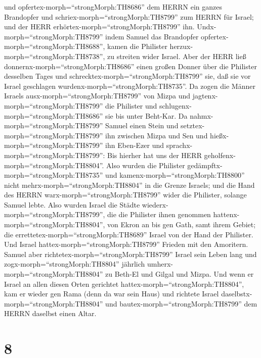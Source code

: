 und opfertex-morph=``strongMorph:TH8686'' dem HERRN ein ganzes
Brandopfer und schriex-morph=``strongMorph:TH8799'' zum HERRN für
Israel; und der HERR erhörtex-morph=``strongMorph:TH8799'' ihn.
 Undx-morph=``strongMorph:TH8799'' indem Samuel das
Brandopfer opfertex-morph=``strongMorph:TH8688'', kamen die Philister
herzux-morph=``strongMorph:TH8738'', zu streiten wider Israel. Aber der
HERR ließ donnernx-morph=``strongMorph:TH8686'' einen großen Donner über
die Philister desselben Tages und
schrecktex-morph=``strongMorph:TH8799'' sie, daß sie vor Israel
geschlagen wurdenx-morph=``strongMorph:TH8735''.  Da zogen
die Männer Israels ausx-morph=``strongMorph:TH8799'' von Mizpa und
jagtenx-morph=``strongMorph:TH8799'' die Philister und
schlugenx-morph=``strongMorph:TH8686'' sie bis unter Beht-Kar.
 Da nahmx-morph=``strongMorph:TH8799'' Samuel einen Stein
und setztex-morph=``strongMorph:TH8799'' ihn zwischen Mizpa und Sen und
hießx-morph=``strongMorph:TH8799'' ihn Eben-Ezer und
sprachx-morph=``strongMorph:TH8799'': Bis hierher hat uns der HERR
geholfenx-morph=``strongMorph:TH8804''.  Also wurden die
Philister gedämpftx-morph=``strongMorph:TH8735'' und
kamenx-morph=``strongMorph:TH8800'' nicht
mehrx-morph=``strongMorph:TH8804'' in die Grenze Israels; und die Hand
des HERRN warx-morph=``strongMorph:TH8799'' wider die Philister, solange
Samuel lebte.  Also wurden Israel die Städte
wiederx-morph=``strongMorph:TH8799'', die die Philister ihnen genommen
hattenx-morph=``strongMorph:TH8804'', von Ekron an bis gen Gath, samt
ihrem Gebiet; die errettetex-morph=``strongMorph:TH8689'' Israel von der
Hand der Philister. Und Israel hattex-morph=``strongMorph:TH8799''
Frieden mit den Amoritern.  Samuel aber
richtetex-morph=``strongMorph:TH8799'' Israel sein Leben lang
 und zogx-morph=``strongMorph:TH8804'' jährlich
umherx-morph=``strongMorph:TH8804'' zu Beth-El und Gilgal und Mizpa. Und
wenn er Israel an allen diesen Orten gerichtet
hattex-morph=``strongMorph:TH8804'',  kam er wieder gen
Rama (denn da war sein Haus) und richtete Israel
daselbstx-morph=``strongMorph:TH8804'' und
bautex-morph=``strongMorph:TH8799'' dem HERRN daselbst einen Altar.

\hypertarget{section-7}{%
\section{8}\label{section-7}}

